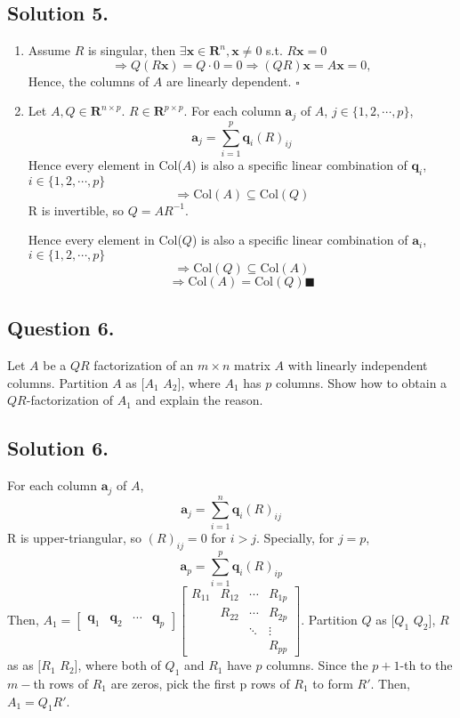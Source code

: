 \documentclass{article}
\begin{document}
\subsection*{Solution 5.}
\begin{enumerate} [label=(\arabic*)]
    \item Assume $R$ is singular, then $\exists \mathbf{x}\in \mathbf{R}^n, \mathbf{x}\neq 0$ s.t. $R\mathbf{x}=0$
    \[\Rightarrow Q(R\mathbf{x})=Q\cdot 0=0\Rightarrow (QR)\mathbf{x}=A\mathbf{x}=0,\]
    Hence, the columns of $A$ are linearly dependent. $\square$
    \item Let $A,Q\in\mathbf{R}^{n\times p}$. $R\in \mathbf{R}^{p\times p}$.\newline
    For each column $\mathbf{a}_j$ of $A$, $j\in\{1,2,\cdots,p\}$, 
    \[\mathbf{a}_j=\sum _{i=1}^p \mathbf{q}_i(R)_{ij}\]
    Hence every element in Col($A$) is also a specific linear combination of $\mathbf{q}_i$,  $i\in\{1,2,\cdots,p\}$
    \[\Rightarrow \text{Col}(A)\subseteq\text{Col}(Q)\]
    R is invertible, so $Q=AR^{-1}$. 
    
    Hence every element in Col($Q$) is also a specific linear combination of $\mathbf{a}_i$,  $i\in\{1,2,\cdots,p\}$
    \[\Rightarrow \text{Col}(Q)\subseteq\text{Col}(A)\]
    \[\Rightarrow \text{Col}(A)=\text{Col}(Q)\blacksquare\]
\end {enumerate}
\subsection*{Question 6.}
Let $A$ be a $QR$ factorization of an $m\times n$ matrix $A$ with linearly independent columns. Partition $A$ as $[A_1$ $A_2]$, where $A_1$ has $p$ columns. Show how to obtain a $QR$-factorization of $A_1$ and explain the reason.
\subsection*{Solution 6.}
For each column $\mathbf{a}_j$ of $A$, 
\[\mathbf{a}_j=\sum_{i=1}^n \mathbf{q}_i(R)_{ij}\]
R is upper-triangular, so $(R)_{ij}=0$ for $i>j$. Specially, for $j=p$,
\[\mathbf{a}_p=\sum_{i=1}^p  \mathbf{q}_i(R)_{ip}\]
Then, $A_1=[\begin{array}{rrrr}\mathbf{q}_1&\mathbf{q}_2&\cdots&\mathbf{q}_p
\end{array}]\left[\begin{array}{rrrr}
R_{11} & R_{12}&\cdots&R_{1p} \\
 &R_{22}&\cdots&R_{2p}\\
 &&\ddots&\vdots\\
 &&&R_{pp}
\end{array}\right]$.\newline
Partition $Q$ as $[Q_1$ $Q_2]$, $R$ as as $[R_1$ $R_2]$, where both of $Q_1$ and $R_1$ have $p$ columns.\newline
Since the $p+1$-th to the $m-$th rows of $R_1$ are zeros, pick the first p rows of $R_1$ to form $R'$. Then, $A_1=Q_1R'$.
\end{document}
